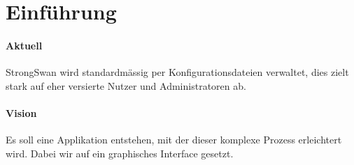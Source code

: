 \section{Einführung}
\label{subsec:vision}
\paragraph{Aktuell}
StrongSwan wird standardmässig per Konfigurationsdateien verwaltet, dies zielt stark auf eher versierte Nutzer und Administratoren ab.\\

\paragraph{Vision} 
Es soll eine Applikation entstehen, mit der dieser komplexe Prozess erleichtert wird. Dabei wir auf ein graphisches Interface gesetzt.\\
